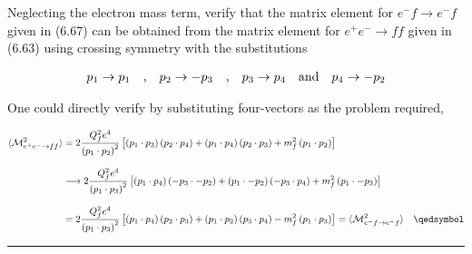 \begin{problem}{6.11}
Neglecting the electron mass term, verify that the matrix element for $e^- f \to e^- f$ given in (6.67) can be obtained from the matrix element for $e^+e^-\to ff$ given in (6.63) using crossing symmetry with the substitutions

\begin{align*}
    p_1 \to p_1 \quad \text{,} \quad p_2 \to -p_3 \quad \text{,} \quad p_3 \to p_4 \quad \text{and} \quad p_4 \to -p_2 \\
\end{align*}
\end{problem}
\begin{solution}
    One could directly verify by substituting four-vectors as the problem required,

    \begin{align*}
        \expval{\mathcal{M}_{e^+e^-\to ff}^2} &= 2 \frac{Q_f^2 e^4}{\left(p_1\cdot p_2\right)^2} \left[ \left(p_1 \cdot p_3\right) \left( p_2 \cdot p_4 \right) + \left(p_1 \cdot p_4\right)\left( p_2 \cdot p_3 \right) + m_f^2 \left( p_1 \cdot p_2\right) \right] \\[0.12in]
        &\longrightarrow   2 \frac{Q_f^2 e^4}{\left(p_1\cdot p_3\right)^2} \left[ \left(p_1 \cdot p_4\right) \left(- p_3 \cdot- p_2 \right) + \left(p_1 \cdot -p_2\right)\left( -p_3 \cdot p_4 \right) + m_f^2 \left( p_1 \cdot - p_3\right) \right] \\[0.12in]
        &= 2 \frac{Q_f^2 e^4}{\left(p_1\cdot p_3\right)^2} \left[ \left(p_1 \cdot p_4\right) \left( p_2 \cdot  p_3 \right) + \left(p_1 \cdot p_2\right)\left( p_3 \cdot p_4 \right) - m_f^2 \left( p_1 \cdot   p_3\right) \right] =   \expval{\mathcal{M}_{e^-f\to e^-f}^2} \qed
    \end{align*}
\end{solution}

\noindent\rule{7in}{1.5pt}


